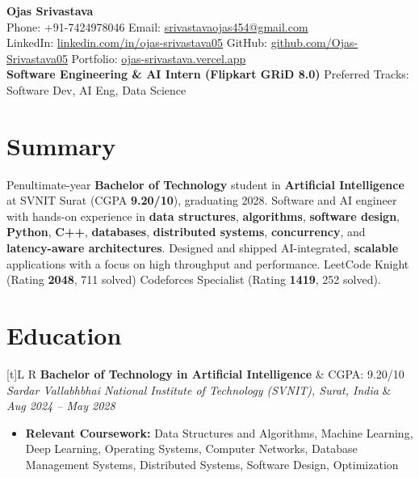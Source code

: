 \documentclass[a4paper,10pt]{article}
\newcommand{\resumeSubheading}[4]{
  \vspace{0.5mm}
  \noindent
  \begin{tabularx}{\textwidth}[t]{L R}
    \textbf{#1} & #4 \\
    \textit{#3} & \textit{#2} \\
  \end{tabularx}
  \vspace{-0.5mm}
}
\begin{document}
\selectfont

\begin{center}
  {\LARGE \textbf{Ojas Srivastava}} \\[1mm]
  \small
  Phone: +91-7424978046 \textbar{}
  Email: \href{mailto:srivastavaojas454@gmail.com}{srivastavaojas454@gmail.com} \\[0.5mm]
  LinkedIn: \href{https://linkedin.com/in/ojas-srivastava05}{linkedin.com/in/ojas-srivastava05} \textbar{}
  GitHub: \href{https://github.com/Ojas-Srivastava05}{github.com/Ojas-Srivastava05} \textbar{}
  Portfolio: \href{https://ojas-srivastava.vercel.app}{ojas-srivastava.vercel.app} \\[0.5mm]
  \textbf{Software Engineering \& AI Intern (Flipkart GRiD 8.0)} \textbar{}
  Preferred Tracks: Software Dev, AI Eng, Data Science
\end{center}

\vspace{-1mm}

\section{Summary}
\small
Penultimate-year \textbf{Bachelor of Technology} student in \textbf{Artificial Intelligence} at SVNIT Surat (CGPA \textbf{9.20/10}), graduating 2028. Software and AI engineer with hands-on experience in \textbf{data structures}, \textbf{algorithms}, \textbf{software design}, \textbf{Python}, \textbf{C++}, \textbf{databases}, \textbf{distributed systems}, \textbf{concurrency}, and \textbf{latency-aware architectures}. Designed and shipped AI-integrated, \textbf{scalable} applications with a focus on high throughput and performance. LeetCode Knight (Rating \textbf{2048}, 711 solved) \textbar{} Codeforces Specialist (Rating \textbf{1419}, 252 solved).

\section{Education}
\small
\resumeSubheading
  {Bachelor of Technology in Artificial Intelligence}{Aug 2024 -- May 2028}
  {Sardar Vallabhbhai National Institute of Technology (SVNIT), Surat, India}{CGPA: 9.20/10}
\begin{itemize}
  \item \textbf{Relevant Coursework:} Data Structures and Algorithms, Machine Learning, Deep Learning, Operating Systems, Computer Networks, Database Management Systems, Distributed Systems, Software Design, Optimization
\end{itemize}
\end{document}
